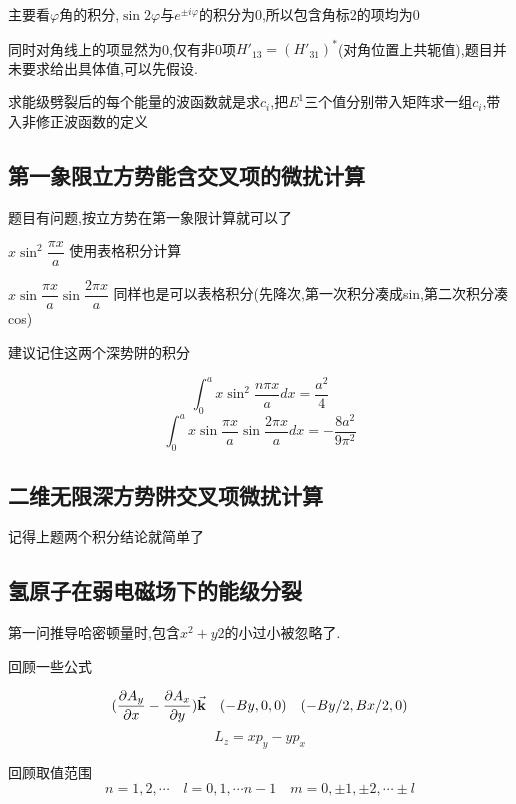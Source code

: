 \documentclass{article}
\begin{document}
            主要看$\varphi$角的积分,$\sin{2\varphi}$与$e^{\pm i \varphi}$的积分为$0$,所以包含角标$2$的项均为0

            同时对角线上的项显然为0,仅有非0项$H'_{13} = (H'_{31})^{*} $(对角位置上共轭值),题目并未要求给出具体值,可以先假设.

            求能级劈裂后的每个能量的波函数就是求$c_{i}$,把$E^{1}$三个值分别带入矩阵求一组$c_{i}$,带入非修正波函数的定义


        \subsection{第一象限立方势能含交叉项的微扰计算}
            题目有问题,按立方势在第一象限计算就可以了

            $ x \sin^{2}{\dfrac{\pi x }{a}} $ 使用表格积分计算

            $ x \sin{\dfrac{\pi x }{a}} \sin{\dfrac{2 \pi x }{a}} $ 同样也是可以表格积分(先降次,第一次积分凑成sin,第二次积分凑cos)

            \begin{formal}
                建议记住这两个深势阱的积分

                $$ \int_{0}^{a} x \sin^{2}{\dfrac{n \pi x }{a}} dx = \frac{a^{2}}{4} $$
                $$ \int_{0}^{a} x \sin{\dfrac{\pi x }{a}} \sin{\dfrac{2 \pi x }{a}} dx = - \frac{8a^{2}}{9\pi^{2}} $$
            \end{formal}



        \subsection{二维无限深方势阱交叉项微扰计算}
            记得上题两个积分结论就简单了


        
        \subsection{氢原子在弱电磁场下的能级分裂}
            第一问推导哈密顿量时,包含$x^{2} + y{2}$的小过小被忽略了.
            
            回顾一些公式

            $$ (\pdv{A_{y}}{x} - \pdv{A_{x}}{y})\va{k} \quad (-By,0,0) \quad (-By/2,Bx/2,0)$$
            $$ L_{z} = xp_{y} - yp_{x} $$

            回顾取值范围
            $$ n = 1,2,\cdots \quad l = 0,1,\cdots n-1 \quad m = 0,\pm 1,\pm 2,\cdots \pm l $$
\end{document}
